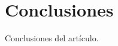 \documentclass[12pt, a4paper]{article}
\theoremstyle{definition}
\theoremstyle{plain}
\begin{document}

\section{Conclusiones}

Conclusiones del artículo.

\printbibliography
\end{document}
